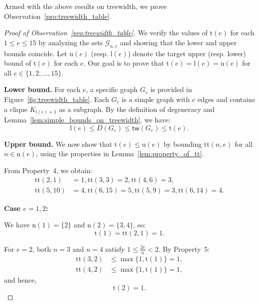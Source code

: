 \documentclass[twoside,11pt]{article}
\newcommand{\treewidthp}[1]{\mathsf{tw}(#1)}
\newcommand{\graphset}{\mathcal{G}}
\newcommand{\graphsetne}[2]{\graphset_{#1,#2}}
\newcommand{\degeneracy}{D}
\newcommand{\degeneracyg}[1]{\degeneracy(#1)}
\newcommand{\completegraphp}[1]{K_{#1}}
\begin{document}
Armed with the above results on treewidth, we prove Observation~\ref{pro:treewidth_table}.
\begin{proof}[Proof of Observation~\ref{pro:treewidth_table}]

We verify the values of $\mathrm{t}(e)$ for each $1 \le e \le 15$ by analyzing the sets $\graphsetne{n}{e}$ and showing that the lower and upper bounds coincide. Let $\mathrm{u}(e)$ (resp. $\mathrm{l}(e)$) denote the target upper (resp. lower) bound of $\mathrm{t}(e)$ for each $e$. Our goal is to prove that $\mathrm{t}(e) = \mathrm{l}(e) = \mathrm{u} (e)$ for all $e \in \{1, 2, \dots, 15\}$.

    \textbf{Lower bound.} For each $e$, a specific graph $G_e$ is provided in Figure~\ref{fig:treewidth_table}. Each $G_e$ is a simple graph with $e$ edges and contains a clique $\completegraphp{\mathrm{l}(e)+1}$ as a subgraph. By the definition of degeneracy and Lemma~\ref{lem:simple_bounds_on_treewidth}, we have:
    \begin{equation*}
        \mathrm{l}(e) \leq \degeneracyg{G_e} \leq \treewidthp{G_e} \leq \mathrm{t}(e).
    \end{equation*}

   \textbf{Upper bound.} We now show that $\mathrm{t}(e) \leq \mathrm{u}(e)$ by bounding $\mathrm{tt}(n,e)$ for all $n \in \mathrm{n}(e)$, using the properties in Lemma~\ref{lem:property_of_tt}.

From Property~4, we obtain:
\begin{align*}
    \mathrm{tt}(2,1) & = 1, \mathrm{tt}(3,3) = 2, \mathrm{tt}(4,6) = 3, \\ \mathrm{tt}(5,10) & = 4, \mathrm{tt}(6,15) = 5, \mathrm{tt}(5,9) = 3, \mathrm{tt}(6,14) = 4.
\end{align*}

\textbf{Case $e = 1, 2$:}

We have $\mathrm{n}(1) = \{2\}$ and $\mathrm{n}(2) = \{3, 4\}$, so:
\begin{equation*}
    \mathrm{t}(1) = \mathrm{tt}(2,1) = 1.
\end{equation*}

For $e = 2$, both $n = 3$ and $n = 4$ satisfy $1 \leq \frac{2e}{n} < 2$. By Property~5:
\begin{align*}
    \mathrm{tt}(3,2) &\leq \max\{1, \mathrm{t}(1)\} = 1, \\
    \mathrm{tt}(4,2) &\leq \max\{1, \mathrm{t}(1)\} = 1,
\end{align*}
and hence,
\begin{equation*}
    \mathrm{t}(2) = 1.
\end{equation*}


\end{proof}
\end{document}
